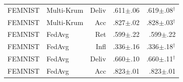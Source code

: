 \begin{tabular}{llrrr}
FEMNIST & Multi-Krum & Deliv & .611$\pm$.06 & .619$\pm$.08$^{\dagger}$ \\
FEMNIST & Multi-Krum & Acc & .827$\pm$.02 & .828$\pm$.03$^{\dagger}$ \\
FEMNIST & FedAvg & Ret & .599$\pm$.22 & .599$\pm$.22 \\
FEMNIST & FedAvg & Infl & .336$\pm$.16 & .336$\pm$.18$^{\dagger}$ \\
FEMNIST & FedAvg & Deliv & .660$\pm$.10 & .660$\pm$.11$^{\dagger}$ \\
FEMNIST & FedAvg & Acc & .823$\pm$.01 & .823$\pm$.01 \\
\bottomrule
\end{tabular}

